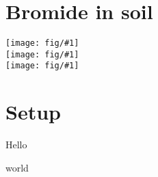 \documentclass[a4paper]{article}
\newcommand{\fig}[1]{\texttt{[image: fig/\#1]}}
\begin{document}
\section*{Bromide in soil}

\noindent\fig{without}\\
\fig{macro}\\
\fig{drain}

\pagebreak{}
\section*{Setup}

Hello

world
\end{document}
